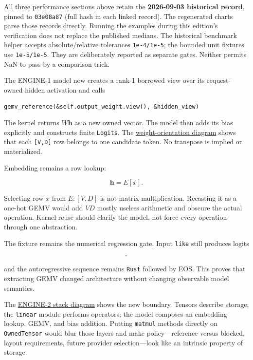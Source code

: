 All three performance sections above retain the \textbf{2026-09-03
historical record}, pinned to \texttt{03e08a87} (full hash in each
linked record). The regenerated charts parse those records directly.
Running the examples during this edition's verification does not replace
the published medians. The historical benchmark helper accepts
absolute/relative tolerances \texttt{1e-4/1e-5}; the bounded unit
fixtures use \texttt{1e-5/1e-5}. They are deliberately reported as
separate gates. Neither permits NaN to pass by a comparison trick.

The ENGINE-1 model now creates a rank-1 borrowed view over its
request-owned hidden activation and calls

\begin{verbatim}
gemv_reference(&self.output_weight.view(), &hidden_view)
\end{verbatim}

The kernel returns \(W\mathbf{h}\) as a new owned vector. The model then
adds its bias explicitly and constructs finite \texttt{Logits}. The
\href{https://github.com/hermonai/inside-the-llm-engine/blob/astra-visual-rewrite/diagrams/linear/weight-orientation.txt}{weight-orientation
diagram} shows that each \texttt{{[}V,D{]}} row belongs to one candidate
token. No transpose is implied or materialized.

Embedding remains a row lookup:

\begin{equation}
\mathbf{h}=E[x].
\end{equation}

Selecting row \(x\) from \(E:[V,D]\) is not matrix multiplication.
Recasting it as a one-hot GEMV would add \(VD\) mostly useless
arithmetic and obscure the actual operation. Kernel reuse should clarify
the model, not force every operation through one abstraction.

The  fixture remains the numerical regression gate. Input
\texttt{like} still produces logits

\begin{equation}
[-0.7,\ 0.1,\ 0.4,\ 2.2],
\end{equation}

and the autoregressive sequence remains \texttt{Rust} followed by EOS.
This proves that extracting GEMV changed architecture without changing
observable model semantics.

The
\href{https://github.com/hermonai/inside-the-llm-engine/blob/astra-visual-rewrite/diagrams/linear/engine-2-kernel-stack.txt}{ENGINE-2
stack diagram} shows the new boundary. Tensors describe storage; the
\texttt{linear} module performs operators; the model composes an
embedding lookup, GEMV, and bias addition. Putting \texttt{matmul}
methods directly on \texttt{OwnedTensor} would blur those layers and
make policy---reference versus blocked, layout requirements, future
provider selection---look like an intrinsic property of storage.

